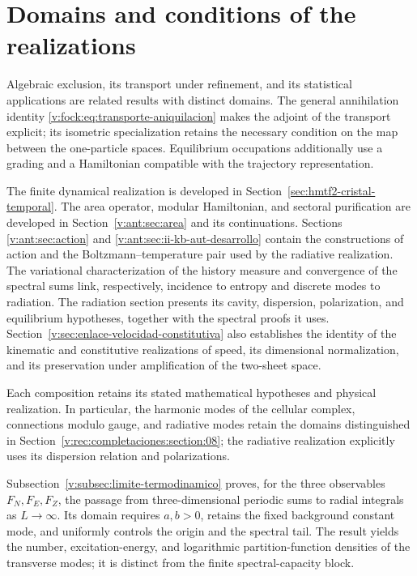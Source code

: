 \section{Domains and conditions of the realizations}
\label{v:integracion}
Algebraic exclusion, its transport under refinement, and its statistical
applications are related results with distinct domains. The general
annihilation identity \eqref{v:fock:eq:transporte-aniquilacion} makes
the adjoint of the transport explicit; its isometric specialization
retains the necessary condition on the map between the one-particle
spaces. Equilibrium occupations additionally use a grading and a
Hamiltonian compatible with the trajectory representation.

The finite dynamical realization is developed in
Section~\ref{sec:hmtf2-cristal-temporal}. The area operator, modular
Hamiltonian, and sectoral purification are developed in
Section~\ref{v:ant:sec:area} and its continuations. Sections
\ref{v:ant:sec:action} and \ref{v:ant:sec:ii-kb-aut-desarrollo}
contain the constructions of action and the Boltzmann--temperature
pair used by the radiative realization. The variational characterization
of the history measure and convergence of the spectral sums link,
respectively, incidence to entropy and discrete modes to radiation.
The radiation section presents its cavity, dispersion, polarization,
and equilibrium hypotheses, together with the spectral proofs it uses.
Section~\ref{v:sec:enlace-velocidad-constitutiva} also establishes
the identity of the kinematic and constitutive realizations of speed,
its dimensional normalization, and its preservation under amplification
of the two-sheet space.

Each composition retains its stated mathematical hypotheses and physical
realization. In particular, the harmonic modes of the cellular complex,
connections modulo gauge, and radiative modes retain the domains
distinguished in Section~\ref{v:rec:completaciones:section:08};
the radiative realization explicitly uses its dispersion relation and
polarizations.

Subsection~\ref{v:subsec:limite-termodinamico} proves, for the three
observables \(F_N,F_E,F_Z\), the passage from three-dimensional periodic
sums to radial integrals as \(L\to\infty\). Its domain requires \(a,b>0\),
retains the fixed background constant mode, and uniformly controls the
origin and the spectral tail. The result yields the number, excitation-energy,
and logarithmic partition-function densities of the transverse modes; it is
distinct from the finite spectral-capacity block.

